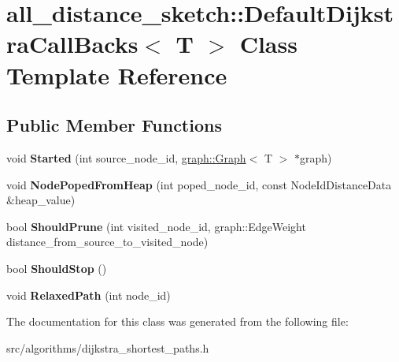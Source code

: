 \hypertarget{classall__distance__sketch_1_1DefaultDijkstraCallBacks}{}\section{all\+\_\+distance\+\_\+sketch\+:\+:Default\+Dijkstra\+Call\+Backs$<$ T $>$ Class Template Reference}
\label{classall__distance__sketch_1_1DefaultDijkstraCallBacks}
\subsection*{Public Member Functions}
\begin{DoxyCompactItemize}
\item 
\hypertarget{classall__distance__sketch_1_1DefaultDijkstraCallBacks_a081a5ff8bad8c45ab361eb8b7a499a72}{}void {\bfseries Started} (int source\+\_\+node\+\_\+id, \hyperlink{classall__distance__sketch_1_1graph_1_1Graph}{graph\+::\+Graph}$<$ T $>$ $\ast$graph)\label{classall__distance__sketch_1_1DefaultDijkstraCallBacks_a081a5ff8bad8c45ab361eb8b7a499a72}

\item 
\hypertarget{classall__distance__sketch_1_1DefaultDijkstraCallBacks_abea33f2f46bef0bf5b502f60e03ec2db}{}void {\bfseries Node\+Poped\+From\+Heap} (int poped\+\_\+node\+\_\+id, const Node\+Id\+Distance\+Data \&heap\+\_\+value)\label{classall__distance__sketch_1_1DefaultDijkstraCallBacks_abea33f2f46bef0bf5b502f60e03ec2db}

\item 
\hypertarget{classall__distance__sketch_1_1DefaultDijkstraCallBacks_a2311e9ae96fbe6b6996a61941aab2b9e}{}bool {\bfseries Should\+Prune} (int visited\+\_\+node\+\_\+id, graph\+::\+Edge\+Weight distance\+\_\+from\+\_\+source\+\_\+to\+\_\+visited\+\_\+node)\label{classall__distance__sketch_1_1DefaultDijkstraCallBacks_a2311e9ae96fbe6b6996a61941aab2b9e}

\item 
\hypertarget{classall__distance__sketch_1_1DefaultDijkstraCallBacks_a487f5fa700dd72f98fb3a140f66238a8}{}bool {\bfseries Should\+Stop} ()\label{classall__distance__sketch_1_1DefaultDijkstraCallBacks_a487f5fa700dd72f98fb3a140f66238a8}

\item 
\hypertarget{classall__distance__sketch_1_1DefaultDijkstraCallBacks_ac8969f6ad1dde138aa1e18836f7b463f}{}void {\bfseries Relaxed\+Path} (int node\+\_\+id)\label{classall__distance__sketch_1_1DefaultDijkstraCallBacks_ac8969f6ad1dde138aa1e18836f7b463f}

\end{DoxyCompactItemize}


The documentation for this class was generated from the following file\+:\begin{DoxyCompactItemize}
\item 
src/algorithms/dijkstra\+\_\+shortest\+\_\+paths.\+h\end{DoxyCompactItemize}
